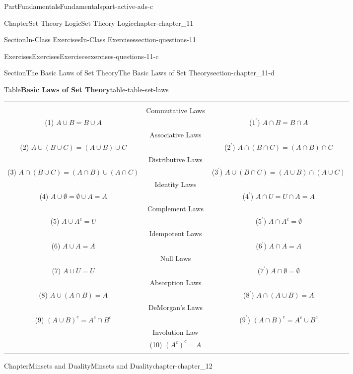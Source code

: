 \documentclass[oneside,10pt,]{book}
\newcommand{\tabularfont}{\relax}
\numberwithin{equation}{section}
\newcommand{\hrulethin}  {\noalign{\hrule height 0.04em}}
\begin{document}
\begin{partptx}{Part}{Fundamentals}{}{Fundamentals}{}{}{part-active-ads-c}
\begin{chapterptx}{Chapter}{Set Theory Logic}{}{Set Theory Logic}{}{}{chapter-chapter_11}
\begin{sectionptx}{Section}{In-Class Exercises}{}{In-Class Exercises}{}{}{section-questions-11}
\begin{exercises-subsection-numberless}{Exercises}{Exercises}{}{Exercises}{}{}{exercises-questions-11-c}
\end{exercises-subsection-numberless}
\end{sectionptx}
%
%
\typeout{************************************************}
\typeout{************************************************}
%
\begin{sectionptx}{Section}{The Basic Laws of Set Theory}{}{The Basic Laws of Set Theory}{}{}{section-chapter_11-d}
\begin{tableptx}{Table}{\textbf{Basic Laws of Set Theory}}{table-table-set-laws}{}%
\centering%
{\tabularfont%
\begin{tabular}{ccc}
&&\tabularnewline[0pt]
&Commutative Laws&\tabularnewline[0pt]
(1) \(A \cup B = B \cup  A\)&&(\(1^{\prime}\)) \(A \cap B = B\cap A\)\tabularnewline\hrulethin
&Associative Laws&\tabularnewline[0pt]
(2) \(A \cup  (B \cup  C)= (A\cup B)\cup C\)&&(\(2^{\prime}\)) \(A \cap  (B \cap  C) = (A \cap  B) \cap  C \)\tabularnewline\hrulethin
&Distributive Laws&\tabularnewline[0pt]
(3) \(A\cap (B \cup  C)=(A\cap B )\cup (A\cap  C)\)&&(\(3^{\prime}\)) \(A \cup (B \cap C) = (A \cup B ) \cap (A\cup C)\)\tabularnewline\hrulethin
&Identity Laws&\tabularnewline[0pt]
(4) \(A \cup  \emptyset  = \emptyset  \cup  A = A\)&&(\(4^{\prime}\)) \(A \cap  U = U \cap  A = A\)\tabularnewline\hrulethin
&Complement Laws&\tabularnewline[0pt]
(5) \(A\cup A^c= U\)&&(\(5^{\prime}\)) \(A\cap A^c= \emptyset\)\tabularnewline\hrulethin
&Idempotent Laws&\tabularnewline[0pt]
(6) \(A \cup  A = A\)&&(\(6^{\prime}\)) \(A\cap  A = A\)\tabularnewline\hrulethin
&Null Laws&\tabularnewline[0pt]
(7) \(A \cup  U = U\)&&(\(7^{\prime}\)) \(A \cap  \emptyset  =\emptyset\)\tabularnewline\hrulethin
&Absorption Laws&\tabularnewline[0pt]
(8) \(A \cup  (A\cap  B) = A\)&&(\(8^{\prime}\)) \(A\cap (A \cup  B) = A\)\tabularnewline\hrulethin
&DeMorgan's Laws&\tabularnewline[0pt]
(9) \((A \cup  B)^c= A^c\cap  B^c\)&&(\(9^{\prime}\)) \((A\cap  B)^c = A^c \cup  B^c\)\tabularnewline\hrulethin
&Involution Law&\tabularnewline[0pt]
&(10) \((A^c)^c= A\)&\tabularnewline\hrulethin
\end{tabular}
}%
\end{tableptx}%
\end{sectionptx}
\end{chapterptx}
%
\typeout{************************************************}
\typeout{************************************************}
%
\begin{chapterptx}{Chapter}{Minsets and Duality}{}{Minsets and Duality}{}{}{chapter-chapter_12}

\end{chapterptx}
\end{partptx}
\end{document}
